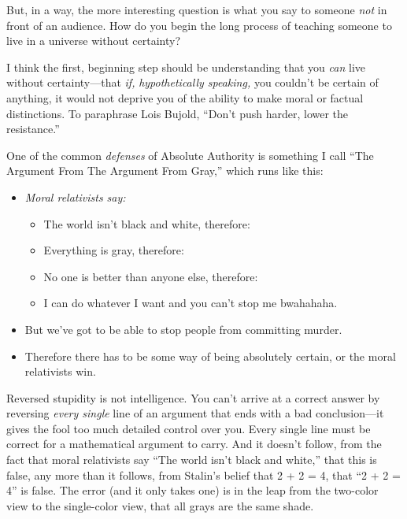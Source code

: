 {
 But, in a way, the more interesting question is what you say to
someone \textit{not} in front of an audience. How do you begin the long
process of teaching someone to live in a universe without certainty?}

{
 I think the first, beginning step should be understanding that you
\textit{can} live without certainty---that \textit{if,}
\textit{hypothetically speaking,} you couldn't be
certain of anything, it would not deprive you of the ability to make
moral or factual distinctions. To paraphrase Lois Bujold,
``Don't push harder, lower the
resistance.''}

{
 One of the common \textit{defenses} of Absolute Authority is
something I call ``The Argument From The Argument From
Gray,'' which runs like this:}

\begin{itemize}
\item \textit{Moral relativists say:}

  \begin{itemize}
    \item The world isn't
      black and white, therefore:
    \item Everything is gray, therefore:
    \item No one is
      better than anyone else, therefore:
      \item I can do whatever I want and you
        can't stop me bwahahaha.
\end{itemize}



\item {
 But we've got to be able to stop people from
committing murder.}

\item {
 Therefore there has to be some way of being absolutely certain, or
 the moral relativists win.}
\end{itemize}

{
 Reversed stupidity is not intelligence. You can't
arrive at a correct answer by reversing \textit{every single} line of
an argument that ends with a bad conclusion---it gives the fool too
much detailed control over you. Every single line must be correct for a
mathematical argument to carry. And it doesn't follow,
from the fact that moral relativists say ``The world
isn't black and white,'' that this is
false, any more than it follows, from Stalin's belief
that 2 + 2 = 4, that ``2 + 2 = 4''
is false. The error (and it only takes one) is in the leap from the
two-color view to the single-color view, that all grays are the same
shade.}

